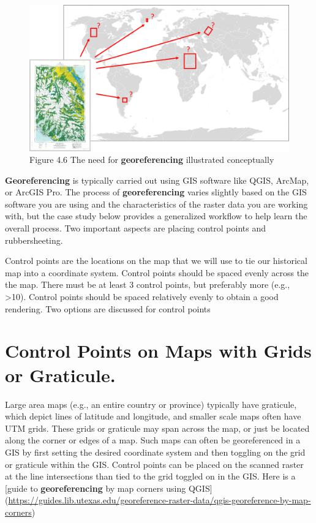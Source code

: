 \documentclass[
]{book}
\begin{document}
\begin{figure}
\centering
\includegraphics{images/04-georeferencing-concept.png}
\caption{Figure 4.6 The need for \textbf{georeferencing} illustrated conceptually}
\end{figure}

\textbf{Georeferencing} is typically carried out using GIS software like QGIS, ArcMap, or ArcGIS Pro. The process of \textbf{georeferencing} varies slightly based on the GIS software you are using and the characteristics of the raster data you are working with, but the case study below provides a generalized workflow to help learn the overall process. Two important aspects are placing control points and rubbersheeting.

Control points are the locations on the map that we will use to tie our historical map into a coordinate system. Control points should be spaced evenly across the the map. There must be at least 3 control points, but preferably more (e.g., \textgreater10). Control points should be spaced relatively evenly to obtain a good rendering. Two options are discussed for control points

\hypertarget{control-points-on-maps-with-grids-or-graticule.}{%
\section{Control Points on Maps with Grids or Graticule.}\label{control-points-on-maps-with-grids-or-graticule.}}

Large area maps (e.g., an entire country or province) typically have graticule, which depict lines of latitude and longitude, and smaller scale maps often have UTM grids. These grids or graticule may span across the map, or just be located along the corner or edges of a map. Such maps can often be georeferenced in a GIS by first setting the desired coordinate system and then toggling on the grid or graticule within the GIS. Control points can be placed on the scanned raster at the line intersections than tied to the grid toggled on in the GIS. Here is a {[}guide to \textbf{georeferencing} by map corners using QGIS{]} (\url{https://guides.lib.utexas.edu/georeference-raster-data/qgis-georeference-by-map-corners})
\end{document}
